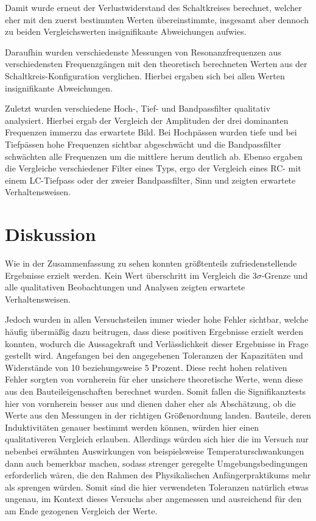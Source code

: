 \documentclass{article}
\begin{document}
Damit wurde erneut der Verlustwiderstand des Schaltkreises berechnet, welcher eher mit den zuerst bestimmten Werten übereinstimmte, insgesamt aber dennoch zu beiden Vergleichswerten insignifikante Abweichungen aufwies. 

Daraufhin wurden verschiedenste Messungen von Resonanzfrequenzen aus verschiedensten Frequenzgängen mit den theoretisch berechneten Werten aus der Schaltkreis-Konfiguration verglichen. Hierbei ergaben sich bei allen Werten insignifikante Abweichungen.

Zuletzt wurden verschiedene Hoch-, Tief- und Bandpassfilter qualitativ analysiert. Hierbei ergab der Vergleich der Amplituden der drei dominanten Frequenzen immerzu das erwartete Bild. Bei Hochpässen wurden tiefe und bei Tiefpässen hohe Frequenzen sichtbar abgeschwächt und die Bandpassfilter schwächten alle Frequenzen um die mittlere herum deutlich ab. Ebenso ergaben die Vergleiche verschiedener Filter eines Typs, ergo der Vergleich eines RC- mit einem LC-Tiefpass oder der zweier Bandpassfilter, Sinn und zeigten erwartete Verhaltensweisen.


\newpage
\section{Diskussion}

Wie in der Zusammenfassung zu sehen konnten größtenteils zufriedenstellende Ergebnisse erzielt werden. Kein Wert überschritt im Vergleich die 3$\sigma$-Grenze und alle qualitativen Beobachtungen und Analysen zeigten erwartete Verhaltensweisen. 

Jedoch wurden in allen Versuchsteilen immer wieder hohe Fehler sichtbar, welche häufig übermäßig dazu beitrugen, dass diese positiven Ergebnisse erzielt werden konnten, wodurch die Aussagekraft und Verlässlichkeit dieser Ergebnisse in Frage gestellt wird. Angefangen bei den angegebenen Toleranzen der Kapazitäten und Widerstände von 10 beziehungsweise 5 Prozent. Diese recht hohen relativen Fehler sorgten von vornherein für eher unsichere theoretische Werte, wenn diese aus den Bauteileigenschaften berechnet wurden. Somit fallen die Signifikanztests hier von vornherein besser aus und dienen daher eher als Abschätzung, ob die Werte aus den Messungen in der richtigen Größenordnung landen. Bauteile, deren Induktivitäten genauer bestimmt werden können, würden hier einen qualitativeren Vergleich erlauben. Allerdings würden sich hier die im Versuch nur nebenbei erwähnten Auswirkungen von beispielsweise Temperaturschwankungen dann auch bemerkbar machen, sodass strenger geregelte Umgebungsbedingungen erforderlich wären, die den Rahmen des Physikalischen Anfängerpraktikums mehr als sprengen würden. Somit sind die hier verwendeten Toleranzen natürlich etwas ungenau, im Kontext dieses Versuchs aber angemessen und ausreichend für den am Ende gezogenen Vergleich der Werte. 
\end{document}
